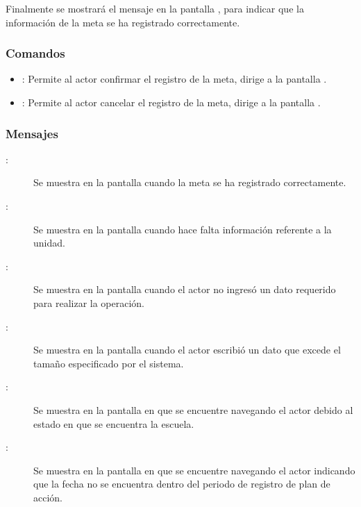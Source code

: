   Finalmente se mostrará el mensaje  en la pantalla , para indicar que la información de la
  meta se ha registrado correctamente.
    
\subsubsection{Comandos}
\begin{itemize}
	\item {}: Permite al actor confirmar el registro de la meta, dirige a la pantalla .
	\item {}: Permite al actor cancelar el registro de la meta, dirige a la pantalla .
\end{itemize}


\subsubsection{Mensajes}

\begin{description}
	\item[:] Se muestra en la pantalla  cuando la meta se ha registrado correctamente.
	\item[:] Se muestra en la pantalla  cuando hace falta información referente a la unidad.
	\item[:] Se muestra en la pantalla  cuando el actor no ingresó un dato requerido para realizar la operación.
	\item[:] Se muestra en la pantalla  cuando el actor escribió un dato que excede el tamaño especificado por el sistema.
	\item[:] Se muestra en la pantalla en que se encuentre navegando el actor debido al estado en que se encuentra la escuela.	
	\item[:] Se muestra en la pantalla en que se encuentre navegando el actor indicando que la fecha no se encuentra dentro del periodo de registro de plan de acción.
\end{description}
